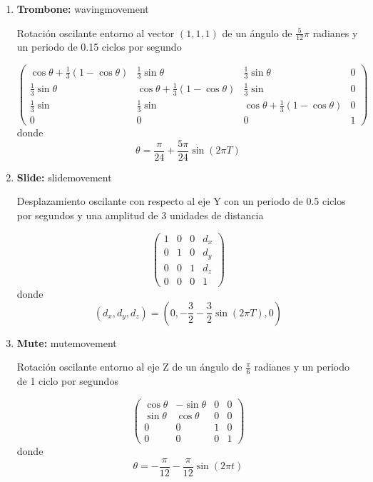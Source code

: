 \documentclass[10pt, a4paper]{article}
\begin{document}
\begin{enumerate}
	\item \textbf{Trombone:} wavingmovement
	
	Rotación oscilante entorno al vector $(1, 1, 1)$ de un ángulo de $\frac{5}{12} \pi$ radianes y un periodo de 0.15 ciclos por segundo

	\begin{equation*}
		\begin{pmatrix}
			\cos \theta + \frac{1}{3}(1 - \cos\theta) & \frac{1}{3} \sin \theta & \frac{1}{3} \sin \theta & 0 \\
			\frac{1}{3} \sin \theta & \cos \theta + \frac{1}{3}(1 - \cos \theta) & \frac{1}{3} \sin & 0 \\
			\frac{1}{3} \sin & \frac{1}{3} \sin & \cos \theta + \frac{1}{3} (1 - \cos \theta) & 0 \\
			0 & 0 & 0 & 1
		\end{pmatrix}
	\end{equation*}
	donde
	\begin{equation*}
		\theta = \frac{\pi}{24} + \frac{5\pi}{24} \sin(2 \pi T)
	\end{equation*}
	\item \textbf{Slide:} slidemovement
	
	Desplazamiento oscilante con respecto al eje Y con un periodo de 0.5 ciclos por segundos y una amplitud de 3 unidades de distancia

	\begin{equation*}
		\begin{pmatrix}
			1 & 0 & 0 & d_x \\
			0 & 1 & 0 & d_y \\
			0 & 0 & 1 & d_z \\
			0 & 0 & 0 & 1
		\end{pmatrix}
	\end{equation*}
	donde
	\begin{equation*}
		(d_x, d_y, d_z) = (0, -\frac{3}{2} - \frac{3}{2}\sin(2\pi T), 0)
	\end{equation*}
	\item \textbf{Mute:} mutemovement
	
	Rotación oscilante entorno al eje Z de un ángulo de $\frac{\pi}{6}$ radianes y un periodo de 1 ciclo por segundos

	\begin{equation*}
		\begin{pmatrix}
			\cos \theta & - \sin \theta & 0 & 0 \\
			\sin \theta & \cos \theta  & 0 & 0 \\
			0 & 0 & 1 & 0 \\
			0 & 0 & 0 & 1
		\end{pmatrix}
	\end{equation*}
	donde
	\begin{equation*}
		\theta = -\frac{\pi}{12} - \frac{\pi}{12}\sin(2 \pi t)
	\end{equation*}
\end{enumerate}
\end{document}
